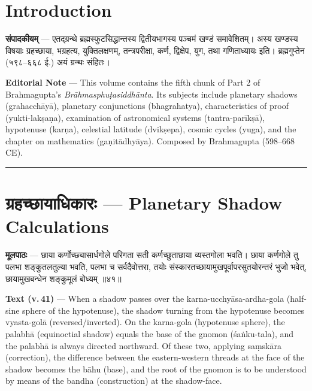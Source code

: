 \documentclass[11pt,a4paper]{article}
\newcommand{\dev}[1]{{\devanagarifont #1}}
\newenvironment{bilingual}{%
  \par\noindent
  \begin{minipage}[t]{0.47\textwidth}%
}{%
  \par\end{minipage}%
}
\newcommand{\rightcol}{%
  \par\end{minipage}%
  \hfill
  \begin{minipage}[t]{0.47\textwidth}%
}
\begin{document}
\section*{Introduction}

\begin{bilingual}
\textbf{संपादकीयम्} --- एतद्ग्रन्थे ब्रह्मस्फुटसिद्धान्तस्य द्वितीयभागस्य पञ्चमं खण्डं समावेशितम्। अस्य खण्डस्य विषयाः ग्रहच्छाया, भग्रहत्य, युक्तिलक्षणम्, तन्त्रपरीक्षा, कर्ण, द्विक्षेप, युग, तथा गणिताध्यायः इति। ब्रह्मगुप्तेन (५९८--६६८ ई.) अयं ग्रन्थः संहितः।
\rightcol
\textbf{Editorial Note} --- This volume contains the fifth chunk of Part 2 of Brahmagupta's \textit{Brāhmasphuṭasiddhānta}. Its subjects include planetary shadows (grahacchāyā), planetary conjunctions (bhagrahatya), characteristics of proof (yukti-lakṣaṇa), examination of astronomical systems (tantra-parīkṣā), hypotenuse (karṇa), celestial latitude (dvikṣepa), cosmic cycles (yuga), and the chapter on mathematics (gaṇitādhyāya). Composed by Brahmagupta (598--668 CE).
\end{bilingual}

\medskip
\noindent\rule{\textwidth}{0.4pt}


\section[\dev{ग्रहच्छायाधिकारः}]{\dev{ग्रहच्छायाधिकारः} --- Planetary Shadow Calculations}

\begin{bilingual}
\textbf{मूलपाठः} --- छाया कर्णोच्छ्यासार्धगोले परिगता सती कर्णच्छुताछाया व्यस्तगोला भवति। छाया कर्णगोले तु पलभा शङ्कुतलतुल्या भवति, पलभा च सर्वदैवोत्तरा, तयोः संस्कारतच्छायामुखपूर्वापरसुतयोरन्तरं भुजो भवेत्, छायामुखबन्धेन शङ्कुमूलं बोध्यम् ॥४१॥
\rightcol
\textbf{Text (v.\,41)} --- When a shadow passes over the karna-ucchyāsa-ardha-gola (half-sine sphere of the hypotenuse), the shadow turning from the hypotenuse becomes vyasta-golā (reversed/inverted). On the karna-gola (hypotenuse sphere), the palabhā (equinoctial shadow) equals the base of the gnomon (śaṅku-tala), and the palabhā is always directed northward. Of these two, applying saṃskāra (correction), the difference between the eastern-western threads at the face of the shadow becomes the bāhu (base), and the root of the gnomon is to be understood by means of the bandha (construction) at the shadow-face.
\end{bilingual}
\end{document}
